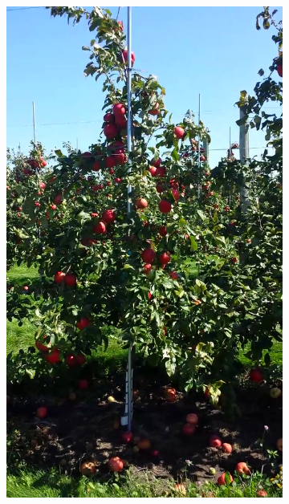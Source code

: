 \begin{figure}[!htb]
\begin{subfigure}[b]{0.18\textwidth}
    \includegraphics[width=\textwidth]{figures/detection/training2.png}%
    \end{subfigure}\hspace{.2cm} \begin{subfigure}[b]{0.18\textwidth}

\end{subfigure}
\end{figure}
